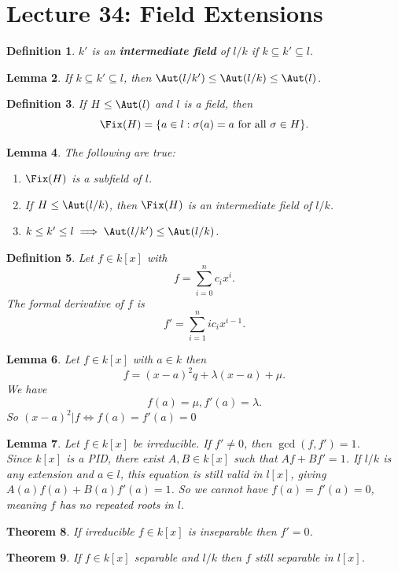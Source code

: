\documentclass[a4paper,12pt]{article}
\newtheorem{thm}{Theorem}[section]
\newtheorem{lem}[thm]{Lemma}
\newtheorem{defn}[thm]{Definition}
\begin{document}
\section{Lecture 34: Field Extensions}
\begin{defn}
    $k'$ is an \textbf{intermediate field} of $l/k$ if $k\subseteq k'\subseteq l$. 
\end{defn}
\begin{lem}
    If $k\subseteq k'\subseteq l$, then $\Aut(l/k')\leq \Aut(l/k)\leq \Aut(l)$.
\end{lem}
\begin{defn}
    If $H\leq \Aut(l)$ and $l$ is a field, then
    \[
    \Fix(H)= \{a\in l: \sigma(a)=a \text{ for all } \sigma\in H\}.
    \]
\end{defn}
\begin{lem}
    The following are true:
    \begin{enumerate}
        \item $\Fix(H)$ is a subfield of $l$.
        \item If $H\leq \Aut(l/k)$, then $\Fix(H)$ is an intermediate field of $l/k$.
        \item $k\leq k'\leq l \implies \Aut(l/k')\leq \Aut(l/k)$.
    \end{enumerate}
\end{lem}
\begin{defn}
    Let $f\in k[x]$ with
    \[
    f=\sum_{i=0}^n c_ix^i \tag{$c_i\in k$}
    .\] 
    The formal derivative of $f$ is 
    \[
    f'=\sum_{i=1}^n ic_ix^{i-1}
    .\] 
\end{defn}
\begin{lem}
    Let $f\in k[x]$ with $a\in k$ then \[
    f=(x-a)^2q+\lambda (x-a)+\mu
    .\] 
    We have \[
    f(a)=\mu, f'(a)=\lambda 
    .\] 
    So $(x-a)^2|f\iff f(a)=f'(a)=0$
\end{lem}
\begin{lem}
    Let $f\in k[x]$ be irreducible. If $f'\neq 0$, then $\gcd(f,f')=1$.\\
    Since $k[x]$ is a PID, there exist $A,B\in k[x]$ such that $Af+Bf'=1$. If $l/k$ is any extension and $a\in l$, this equation is still valid in $l[x]$, giving $A(a)f(a)+B(a)f'(a)=1$. So we cannot have $f(a)=f'(a)=0$, meaning $f$ has no repeated roots in $l$.
\end{lem}
\begin{thm}
    If irreducible $f\in k[x]$ is inseparable then $f'=0$. 
\end{thm}
\begin{thm}
    If $f\in k[x]$ separable and $l/k$ then $f$ still separable in $l[x]$. 
\end{thm}
\end{document}
